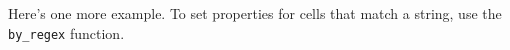 \documentclass[]{article}
\newenvironment{Shaded}{\begin{snugshade}}{\end{snugshade}}
\newcommand{\KeywordTok}[1]{\textcolor[rgb]{0.13,0.29,0.53}{\textbf{#1}}}
\newcommand{\NormalTok}[1]{#1}
\newcommand{\OperatorTok}[1]{\textcolor[rgb]{0.81,0.36,0.00}{\textbf{#1}}}
\newcommand{\StringTok}[1]{\textcolor[rgb]{0.31,0.60,0.02}{#1}}
\begin{document}
Here's one more example. To set properties for cells that match a
string, use the \texttt{by\_regex} function.

\begin{Shaded}
\end{Shaded}

 
  \providecommand{\huxb}[2]{\arrayrulecolor[RGB]{#1}\global\arrayrulewidth=#2pt}
  \providecommand{\huxvb}[2]{\color[RGB]{#1}\vrule width #2pt}
  \providecommand{\huxtpad}[1]{\rule{0pt}{#1}}
  \providecommand{\huxbpad}[1]{\rule[-#1]{0pt}{#1}}
\end{document}
